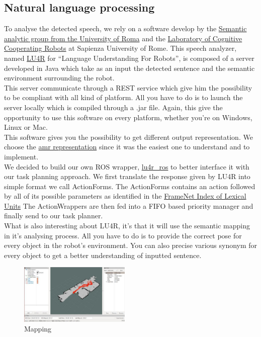 \documentclass[runningheads,a4paper]{llncs}
\begin{document}
\subsection{Natural language processing}
\tab To analyse the detected speech, we rely on a software develop by the  \href{http://sag.art.uniroma2.it/}{Semantic analytic group from the University of Roma} and the \href{http://labrococo.dis.uniroma1.it/}{Laboratory of Cognitive Cooperating Robots} at Sapienza University of Rome. This speech analyzer, named \href{http://sag.art.uniroma2.it/lu4r.html}{LU4R} for “Language Understanding For Robots”, is composed of a server developed in Java which take as an input the detected sentence and the semantic environment surrounding the robot.\\

This server communicate through a REST service which give him the possibility to be compliant with all kind of platform. All you have to do is to launch the server locally which is compiled through a .jar file. Again, this give the opportunity to use this software on every platform, whether you’re on Windows, Linux or Mac. \\

This software gives you the possibility to get different output representation. We choose the \href{https://github.com/amrisi/amr-guidelines/blob/master/amr.md}{amr representation} since it was the easiest one to understand and to implement.\\

We decided to build our own ROS wrapper, \href{https://github.com/WalkingMachine/lu4r_ros}{lu4r\_ros}  to better interface it with our task planning approach. We first translate the response given by LU4R into simple format we call ActionForms. The ActionForms contains an action followed by all of its possible parameters as identified in the \href{https://framenet2.icsi.berkeley.edu/fnReports/data/luIndex.xml}{FrameNet Index of Lexical Units}
The ActionWrappers are then fed into a FIFO based priority manager and finally send to our task planner.\\

What is also interesting about LU4R, it’s that it will use the semantic mapping in it’s analysing process. All you have to do is to provide the correct pose for every object in the robot’s environment. You can also precise various synonym for every object to get a better understanding of inputted sentence.\\

\ifdraft
\begin{figure}
  \centering
  \includegraphics[width=150pt]{images/map.jpg}
  \caption{Mapping}
\end{figure}
\fi
\end{document}
